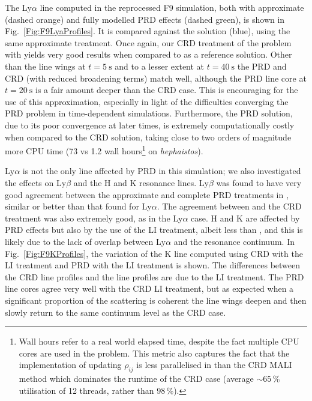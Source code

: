 The Ly$\alpha$ line computed in the reprocessed F9 simulation, both with approximate (dashed orange) and fully modelled PRD effects (dashed green), is shown in Fig.~\ref{Fig:F9LyaProfiles}.
It is compared against the \Radyn{} solution (blue), using the same approximate treatment.
Once again, our CRD treatment of the problem with \Lw{} yields very good results when compared to \Radyn{} as a reference solution.
Other than the line wings at $t=\SI{5}{\second}$ and to a lesser extent at $t=\SI{40}{\second}$ the PRD and CRD (with reduced broadening terms) match well, although the PRD line core at $t=\SI{20}{\second}$ is a fair amount deeper than the CRD case.
This is encouraging for the use of this approximation, especially in light of the difficulties converging the PRD problem in time-dependent simulations.
Furthermore, the PRD solution, due to its poor convergence at later times, is extremely computationally costly when compared to the CRD solution, taking close to two orders of magnitude more CPU time (73 vs 1.2 wall hours\footnote{Wall hours refer to a real world elapsed time, despite the fact multiple CPU cores are used in the problem. This metric also captures the fact that the implementation of updating $\rho_{ij}$ is less parallelised in \Lw{} than the CRD MALI method which dominates the runtime of the CRD case (average $\sim65$\,\% utilisation of 12 threads, rather than 98\,\%).} on \emph{hephaistos}).

Ly$\alpha$ is not the only line affected by PRD in this simulation; we also investigated the effects on Ly$\beta$ and the \Caii{} H and K resonance lines.
Ly$\beta$ was found to have very good agreement between the approximate and complete PRD treatments in \Lw{}, similar or better than that found for Ly$\alpha$.
The agreement between \Radyn{} and the \Lw{} CRD treatment was also extremely good, as in the Ly$\alpha$ case.
\Caii{} H and K are affected by PRD effects but also by the use of the LI treatment, albeit less than \CaLine{}, and this is likely due to the lack of overlap between Ly$\alpha$ and the \Caii{} resonance continuum.
In Fig.~\ref{Fig:F9KProfiles}, the variation of the \Caii{} K line computed using CRD with the LI treatment and PRD with the LI treatment is shown.
The differences between the CRD line profiles and the \Radyn{} line profiles are due to the LI treatment.
The PRD line cores agree very well with the CRD LI treatment, but as expected when a significant proportion of the scattering is coherent the line wings deepen and then slowly return to the same continuum level as the CRD case.

